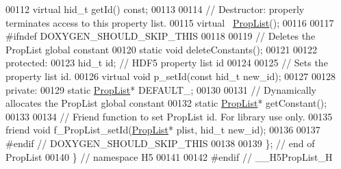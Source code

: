 \begin{DoxyCode}
00112         \textcolor{keyword}{virtual} hid\_t getId() \textcolor{keyword}{const};
00113 
00114         \textcolor{comment}{// Destructor: properly terminates access to this property list.}
00115         \textcolor{keyword}{virtual} ~\hyperlink{class_h5_1_1_prop_list}{PropList}();
00116 
00117 \textcolor{preprocessor}{#ifndef DOXYGEN\_SHOULD\_SKIP\_THIS}
00118 
00119         \textcolor{comment}{// Deletes the PropList global constant}
00120         \textcolor{keyword}{static} \textcolor{keywordtype}{void} deleteConstants();
00121 
00122     \textcolor{keyword}{protected}:
00123         hid\_t id;    \textcolor{comment}{// HDF5 property list id}
00124 
00125         \textcolor{comment}{// Sets the property list id.}
00126         \textcolor{keyword}{virtual} \textcolor{keywordtype}{void} p\_setId(\textcolor{keyword}{const} hid\_t new\_id);
00127 
00128     \textcolor{keyword}{private}:
00129         \textcolor{keyword}{static} \hyperlink{class_h5_1_1_prop_list}{PropList}* DEFAULT\_;
00130 
00131         \textcolor{comment}{// Dynamically allocates the PropList global constant}
00132         \textcolor{keyword}{static} \hyperlink{class_h5_1_1_prop_list}{PropList}* getConstant();
00133 
00134         \textcolor{comment}{// Friend function to set PropList id.  For library use only.}
00135         \textcolor{keyword}{friend} \textcolor{keywordtype}{void} f\_PropList\_setId(\hyperlink{class_h5_1_1_prop_list}{PropList}* plist, hid\_t new\_id);
00136 
00137 \textcolor{preprocessor}{#endif // DOXYGEN\_SHOULD\_SKIP\_THIS}
00138 
00139 \}; \textcolor{comment}{// end of PropList}
00140 \} \textcolor{comment}{// namespace H5}
00141 
00142 \textcolor{preprocessor}{#endif  // \_\_H5PropList\_H}
\end{DoxyCode}
